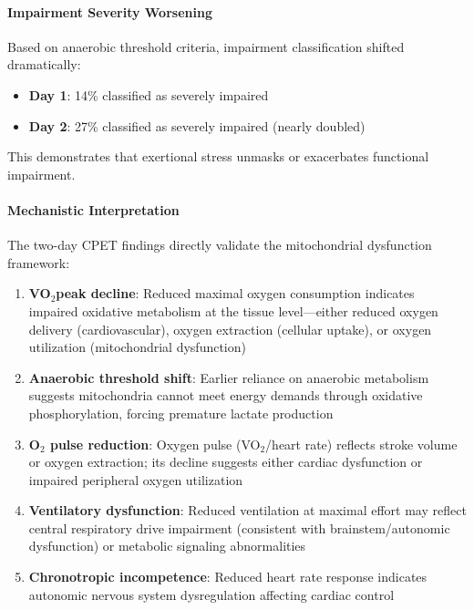 \paragraph{Impairment Severity Worsening}

Based on anaerobic threshold criteria, impairment classification shifted dramatically:
\begin{itemize}
    \item \textbf{Day 1}: 14\% classified as severely impaired
    \item \textbf{Day 2}: 27\% classified as severely impaired (nearly doubled)
\end{itemize}

This demonstrates that exertional stress unmasks or exacerbates functional impairment.

\paragraph{Mechanistic Interpretation}

The two-day CPET findings directly validate the mitochondrial dysfunction framework:

\begin{enumerate}
    \item \textbf{VO$_2$peak decline}: Reduced maximal oxygen consumption indicates impaired oxidative metabolism at the tissue level---either reduced oxygen delivery (cardiovascular), oxygen extraction (cellular uptake), or oxygen utilization (mitochondrial dysfunction)

    \item \textbf{Anaerobic threshold shift}: Earlier reliance on anaerobic metabolism suggests mitochondria cannot meet energy demands through oxidative phosphorylation, forcing premature lactate production

    \item \textbf{O$_2$ pulse reduction}: Oxygen pulse (VO$_2$/heart rate) reflects stroke volume or oxygen extraction; its decline suggests either cardiac dysfunction or impaired peripheral oxygen utilization

    \item \textbf{Ventilatory dysfunction}: Reduced ventilation at maximal effort may reflect central respiratory drive impairment (consistent with brainstem/autonomic dysfunction) or metabolic signaling abnormalities

    \item \textbf{Chronotropic incompetence}: Reduced heart rate response indicates autonomic nervous system dysregulation affecting cardiac control
\end{enumerate}

